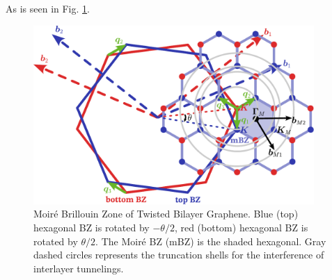 As is seen in Fig. \ref{fig:tBLG_geometry}.

\begin{figure}[!htp]
    \centering
    \includegraphics[width=0.95\textwidth]{figures/tBLG_geometry.pdf}
    \caption{Moir\'e Brillouin Zone of Twisted Bilayer Graphene. Blue (top) hexagonal BZ is rotated by $-\theta/2$, red (bottom) hexagonal BZ is rotated by $\theta/2$. The Moir\'e BZ (mBZ) is the shaded hexagonal. Gray dashed circles represents the truncation shells for the interference of interlayer tunnelings.}
    \label{fig:tBLG_geometry}
\end{figure}


